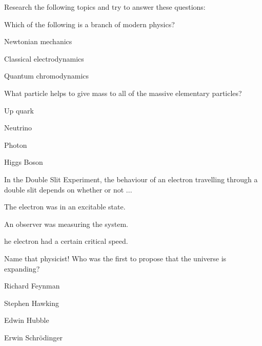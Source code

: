 \begin{reflectresearch}{Research the following topics and try to answer these questions:}

\begin{checkpointMC}{Which of the following is a branch of modern physics?}
\item Newtonian mechanics
\item Classical electrodynamics
\item Quantum chromodynamics
\end{checkpointMC}

\begin{checkpointMC}{What particle helps to give mass to all of the massive elementary particles?}
\item Up quark
\item Neutrino
\item Photon
\item Higgs Boson
\end{checkpointMC}

\begin{checkpointMC}{In the Double Slit Experiment, the behaviour of an electron travelling through a double slit depends on whether or not ...}
\item The electron was in an excitable state.
\item An observer was measuring the system.
\item he electron had a certain critical speed.
\end{checkpointMC}

\begin{checkpointMC}{Name that physicist! Who was the first to propose that the universe is expanding?}
\item Richard Feynman
\item Stephen Hawking
\item Edwin Hubble
\item Erwin Schr\"odinger
\end{checkpointMC}

\end{reflectresearch}